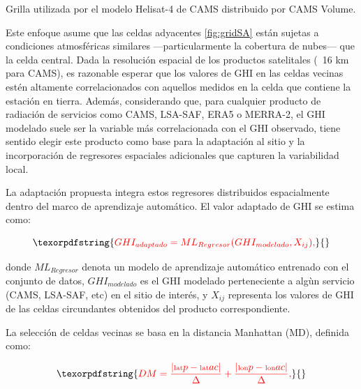\documentclass[letterpaper,12pt, twoside]{report}
\providecommand{\DIFdeltex}[1]{{\protect\color{red} \scriptsize #1}} %
\providecommand{\DIFdelFL}[1]{\DIFdel{#1}} %
\providecommand{\DIFdel}[1]{\texorpdfstring{\DIFdeltex{#1}}{}} %
\begin{document}
{%
\DIFdelFL{Grilla utilizada por el modelo Helisat-4 de CAMS distribuido por CAMS Volume.}}

\DIFdel{Este enfoque asume que las celdas adyacentes \ref{fig:gridSA} están sujetas a condiciones atmosféricas similares —particularmente la cobertura de nubes— que la celda central. Dada la resolución espacial de los productos satelitales (~16 km para CAMS), es razonable esperar que los valores de GHI en las celdas vecinas estén altamente correlacionados con aquellos medidos en la celda que contiene la estación en tierra. Además, considerando que, para cualquier producto de radiación de servicios como CAMS, LSA-SAF, ERA5 o MERRA-2, el GHI modelado suele ser la variable más correlacionada con el GHI observado, tiene sentido elegir este producto como base para la adaptación al sitio y la incorporación de regresores espaciales adicionales que capturen la variabilidad local.
}%

\DIFdel{La adaptación propuesta integra estos regresores distribuidos espacialmente dentro del marco de aprendizaje automático. El valor adaptado de GHI se estima como:
}%

\begin{displaymath}
\DIFdel{GHI_{adaptado} = ML_{Regresor}(GHI_{modelado}, X_{ij}),
}\end{displaymath}%

\DIFdel{donde $ML_{Regresor}$ denota un modelo de aprendizaje automático entrenado con el conjunto de datos, $GHI_{modelado}$ es el GHI modelado perteneciente a algùn servicio (CAMS, LSA-SAF, etc) en el sitio de interés, y $X_{ij}$ representa los valores de GHI de las celdas circundantes obtenidos del producto correspondiente.
}%

\DIFdel{La selección de celdas vecinas se basa en la distancia Manhattan (MD), definida como:
}%

\begin{displaymath}
\DIFdel{DM = \frac{|\text{lat}p - \text{lat}{ac}|}{\Delta} + \frac{|\text{lon}p - \text{lon}{ac}|}{\Delta},
}\end{displaymath}%
\end{document}

